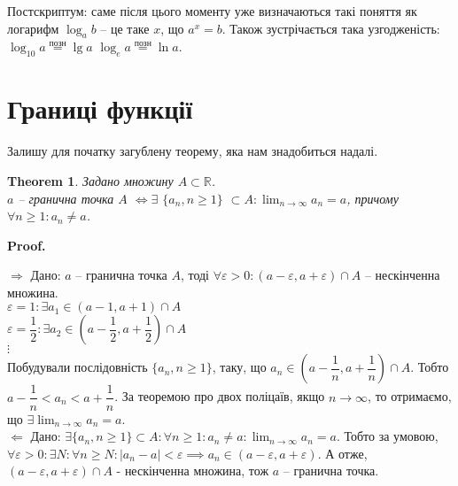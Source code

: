 \documentclass[a4paper, 14pt]{article}
\makeatletter
\def\qed{$\blacksquare$}
\def\rightproof{$\boxed{\Rightarrow}$ }
\def\leftproof{$\boxed{\Leftarrow}$ }
\theoremstyle{theoremdd}
\newtheorem{theorem}{Theorem}[subsection]
\theoremstyle{theoremdd}
\theoremstyle{theoremdd}
\theoremstyle{theoremdd}
\theoremstyle{theoremdd}
\theoremstyle{theoremdd}
\theoremstyle{theoremdd}
\theoremstyle{theoremdd}
\renewenvironment{proof}[1][Proof.\\]{\par
\pushQED{\hfill \qed}%
\normalfont \topsep6\p@\@plus6\p@\relax
\trivlist
\item\relax
{\bfseries
#1\@addpunct{.}}\hspace\labelsep\ignorespaces
}{%
\popQED\endtrivlist\@endpefalse
}
\makeatother
\begin{document}
Постскриптум: саме після цього моменту уже визначаються такі поняття як логарифм $\displaystyle\log_a b$ -- це таке $x$, що $a^x = b$. Також зустрічається така узгодженість:\\
$\log_{10} a \overset{\text{позн}}{=} \lg a$ \hspace{0.5cm} $\log_e a \overset{\text{позн}}{=} \ln a$.
	\newpage
	
	\setcounter{section}{3}
	\section{Границі функції}
	Залишу для початку загублену теорему, яка нам знадобиться надалі.
	\begin{theorem}
	Задано множину $A \subset \mathbb{R}$.\\
	$a$ -- гранична точка $A$ $\iff \exists$ $\{a_n, n \geq 1\}$ $\subset A: \displaystyle \lim_{n \to \infty} a_n = a$, причому $\forall n \geq 1: a_n \neq a$.
	\end{theorem}
	
	\begin{proof}
	\rightproof Дано: $a$ -- гранична точка $A$, тоді $\forall \varepsilon > 0: (a-\varepsilon, a + \varepsilon) \cap A$ -- нескінченна множина.\\
	$\varepsilon = 1: \exists a_1 \in (a-1,a+1) \cap A$\\
	$\varepsilon = \dfrac{1}{2}: \exists a_2 \in \left(a-\dfrac{1}{2}, a+\dfrac{1}{2}\right) \cap A$\\
	$\vdots$\\
	Побудували послідовність $\{a_n, n \geq 1\}$, таку, що $a_n \in \left(a-\dfrac{1}{n}, a+\dfrac{1}{n}\right) \cap A$. Тобто $a - \dfrac{1}{n} < a_n < a + \dfrac{1}{n}$. За теоремою про двох поліцаїв, якщо $n \to \infty$, то отримаємо, що $\exists \displaystyle \lim_{n \to \infty} a_n = a$.
	\bigskip \\
	\leftproof Дано: $\exists \{a_n, n \geq 1\} \subset A: \forall n \geq 1: a_n \neq a: \displaystyle \lim_{n \to \infty} a_n = a$. Тобто за умовою,\\ $\forall \varepsilon > 0: \exists N: \forall n \geq N: |a_n-a|<\varepsilon \implies a_n \in (a-\varepsilon,a+\varepsilon)$. А отже, $(a-\varepsilon,a+\varepsilon) \cap A$ - нескінченна множина, тож $a$ -- гранична точка.
\end{proof}

\iffalse
\end{document}
